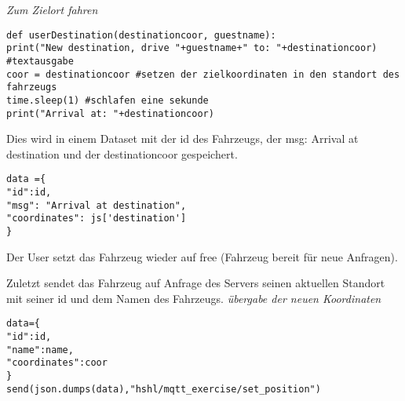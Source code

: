 \textit{Zum Zielort fahren}
\begin{lstlisting}
def userDestination(destinationcoor, guestname):
print("New destination, drive "+guestname+" to: "+destinationcoor) #textausgabe
coor = destinationcoor #setzen der zielkoordinaten in den standort des fahrzeugs
time.sleep(1) #schlafen eine sekunde
print("Arrival at: "+destinationcoor)
\end{lstlisting}

Dies wird in einem Dataset mit der id des Fahrzeugs, der msg: Arrival at destination und der destinationcoor gespeichert.

\begin{lstlisting}
data ={
"id":id,
"msg": "Arrival at destination",
"coordinates": js['destination']
}
\end{lstlisting}
Der User setzt das Fahrzeug wieder auf free (Fahrzeug bereit für neue Anfragen).


Zuletzt sendet das Fahrzeug auf Anfrage des Servers seinen aktuellen Standort mit seiner id und dem Namen des Fahrzeugs. 
\textit{übergabe der neuen Koordinaten}
\begin{lstlisting}
data={
"id":id,
"name":name,
"coordinates":coor
}
send(json.dumps(data),"hshl/mqtt_exercise/set_position")

\end{lstlisting}




















